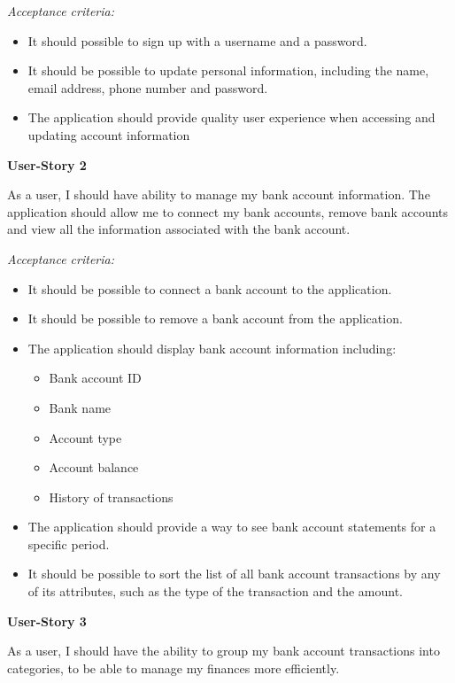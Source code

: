 \documentclass[11pt]{article}
\newcounter{use case ID}
\begin{document}
\textit{Acceptance criteria:}
\begin{itemize}
    \item It should possible to sign up with a username and a password.
    \item It should be possible to update personal information, including the name, email address, phone number and password.
    \item The application should provide quality user experience when accessing and updating account information
\end{itemize}

\clearpage

\textbf{User-Story 2}

As a user, I should have ability to manage my bank account information. The application should allow me to connect my bank accounts, remove bank accounts and view all the information associated with the bank account.

\textit{Acceptance criteria:}
\begin{itemize}
    \item It should be possible to connect a bank account to the application.
    \item It should be possible to remove a bank account from the application.
    \item The application should display bank account information including:
        \begin{itemize}
            \item Bank account ID
            \item  Bank name
            \item Account type
            \item Account balance
            \item History of transactions
        \end{itemize}
    \item The application should provide a way to see bank account statements for a specific period.
    \item It should be possible to sort the list of all bank account transactions by any of its attributes, such as the type of the transaction and the amount.
\end{itemize}

\textbf{User-Story 3}

As a user, I should have the ability to group my bank account transactions into categories, to be able to manage my finances more efficiently.
\end{document}
